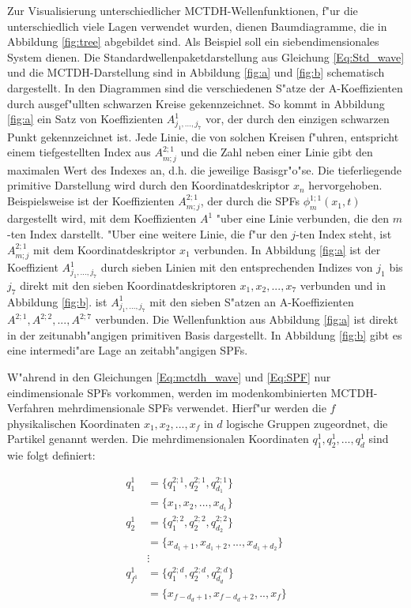 Zur Visualisierung unterschiedlicher MCTDH-Wellenfunktionen, f"ur die unterschiedlich viele Lagen verwendet wurden, dienen Baumdiagramme,
die in Abbildung \ref{fig:tree} abgebildet sind.
Als Beispiel soll ein siebendimensionales System dienen.
Die Standardwellenpaketdarstellung aus Glei\-chung \ref{Eq:Std_wave} und die MCTDH-Darstellung sind in Abbildung \ref{fig:a} und \ref{fig:b} schematisch dargestellt.
In den Diagrammen sind die verschiedenen S"atze der A-Koeffizienten durch ausgef"ullten schwarzen Kreise gekennzei\-chnet.
So kommt in Abbildung \ref{fig:a} ein Satz von Koeffizienten $A^{1}_{j_{1}, ..., j_{7}}$ vor, der durch den
einzigen schwarzen Punkt gekennzei\-chnet ist. 
Jede Linie, die von solchen Kreisen f"uhren, entspricht einem tiefgestellten Index aus $ A^{2;1}_{m;j} $ und die Zahl neben einer Linie gibt den maximalen
Wert des Indexes an, d.h. die jeweilige Basisgr"o"se. Die tieferliegende primitive Darstellung wird durch den Koordinatdeskriptor $x_n$ hervorgehoben.
Beispielsweise ist der Koeffizienten $A^{2;1}_{m;j}$, der durch die SPFs $ \phi^{1;1}_{m} (x_{1}, t) $ dargestellt wird, mit dem 
Koeffizienten $A^1$ "uber eine Linie verbunden, die den $m$-ten Index darstellt. "Uber eine weitere Linie, die f"ur den $j$-ten Index steht,
ist  $A^{2;1}_{m;j}$ mit dem Koordinatdeskriptor $x_1$ verbunden.
In Abbildung \ref{fig:a} ist der Koeffizient $A^{1}_{j_{1}, ..., j_{7}}$  durch sieben Linien mit den entsprechenden Indizes von 
$j_1$ bis $j_7$ direkt mit den sieben Koordinatdeskriptoren $x_1,x_2,...,x_7$ verbunden und in Abbildung \ref{fig:b}. ist $A^{1}_{j_{1}, ..., j_{7}}$
mit den sieben S"atzen an A-Koeffizienten $A^{2;1},A^{2;2},...,A^{2;7}$ verbunden.
Die Wellenfunktion aus Abbildung \ref{fig:a} ist direkt 
in der zeitunabh"angigen primitiven Basis dargestellt. In Abbildung \ref{fig:b} gibt es eine intermedi"are Lage an zeitabh"angigen SPFs. 

W"ahrend in den Gleichungen \ref{Eq:mctdh_wave} und \ref{Eq:SPF} nur eindimensionale SPFs vorkommen, werden im modenkombinierten MCTDH-Verfahren
mehrdimensionale SPFs verwendet. 
Hier\-f"ur werden die $f$ physikalischen Koordinaten $x_{1}, x_{2}, ..., x_{f}$  in $d$ logische Gruppen zugeordnet, die Partikel genannt werden.
Die mehrdimensionalen Koordinaten $q^{1}_{1}, q^{1}_{2}, ..., q^{1}_{d}$ sind wie folgt definiert:


\begin{align*}
  q^{1}_{1} &= \{q^{2;1}_{1},q^{2;1}_{2},q^{2;1}_{d_{1}}\}\\ 
            &= \{x_{1}, x_{2}, ..., x_{d_1}\} \\
  q^{1}_{2} &= \{q^{2;2}_{1},q^{2;2}_{2},q^{2;2}_{d_{2}}\}\\ 
            &= \{x_{d_{1}+1}, x_{d_{1}+2}, ..., x_{d_{1}+d_{2}}\} \\
            &\vdots\\
  q^{1}_{f^1} &= \{q^{2;d}_{1},q^{2;d}_{2},q^{2;d}_{d_{d}}\} \\
            &= \{x_{f-d_d+1},x_{f-d_d+2},..,x_{f}\}
\end{align*}


